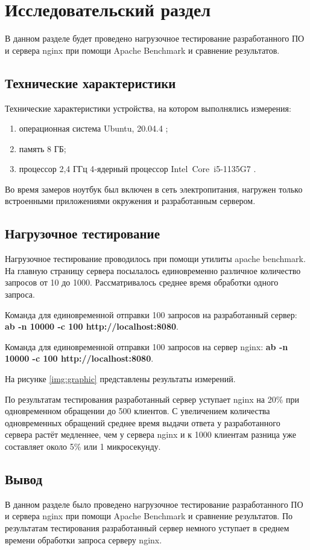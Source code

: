 \chapter{Исследовательский раздел}

В данном разделе будет проведено нагрузочное тестирование разработанного ПО и сервера nginx при помощи Apache Benchmark и сравнение результатов.

\section{Технические характеристики}

Технические характеристики устройства, на котором выполнялись измерения:

\begin{enumerate}[label=\arabic*.]
	\item операционная система Ubuntu, 20.04.4 \cite{ubuntu};
	\item память 8 ГБ;
	\item процессор 2,4 ГГц 4‑ядерный процессор Intel Core i5-1135G7 \cite{intel}.
\end{enumerate}

Во время замеров ноутбук был включен в сеть электропитания, нагружен только встроенными приложениями окружения и разработанным сервером.

\section{Нагрузочное тестирование}

Нагрузочное тестирование проводилось при помощи утилиты apache benchmark. На главную страницу сервера посылалось единовременно различное количество запросов от 10 до 1000. Рассматривалось среднее время обработки одного запроса.

Команда для единовременной отправки 100 запросов на разработанный сервер: \newline \textbf{ab -n 10000 -c 100 http://localhost:8080}.

Команда для единовременной отправки 100 запросов на сервер nginx: \newline \textbf{ab -n 10000 -c 100 http://localhost:8080}.

На рисунке \ref{img:graphic} представлены результаты измерений.

\pagebreak


По результатам тестирования разработанный сервер уступает nginx на 20\% при одновременном обращении до 500 клиентов. С увеличением количества одновременных обращений среднее время выдачи ответа у разработанного сервера растёт медленнее, чем у сервера nginx и к 1000 клиентам разница уже составляет около 5\% или 1 микросекунду.

\section*{Вывод}

В данном разделе было проведено нагрузочное тестирование разработанного ПО и сервера nginx при помощи Apache Benchmark и сравнение результатов.
По результатам тестирования разработанный сервер немного уступает в среднем времени обработки запроса серверу nginx.
